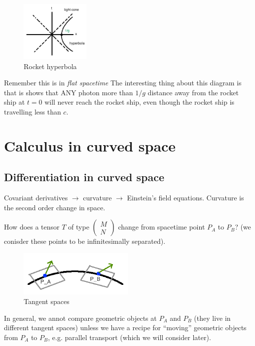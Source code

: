 \documentclass[a4paper]{article} %
\newcommand{\pmx}[1]{
\begin{pmatrix}
#1
\end{pmatrix}
}
\begin{document}
\begin{figure}[h]
\centering
\includegraphics[width=0.3\textwidth]{images/rocket_hyperbola.png}
\caption{Rocket hyperbola}
\end{figure}

Remember this is in \emph{flat spacetime} The interesting thing about this diagram is that is shows that ANY photon more than $1/g$ distance away from the rocket ship at $t=0$ will never reach the rocket ship, even though the rocket ship is travelling less than $c$.


\section{Calculus in curved space}

\subsection{Differentiation in curved space}
Covariant derivatives $\to$ curvature $\to$ Einstein's field equations. Curvature is the second order change in space.

How does a tensor $T$ of type $\pmx{M\\N}$ change from spacetime point $P_A$ to $P_B$? (we conisder these points to be infinitesimally separated).

\begin{figure}[h]
\centering
\includegraphics[width=0.5\textwidth]{images/tangent-spaces.png}
\caption{Tangent spaces}
\end{figure}

In general, we annot compare geometric objects at $P_A$ and $P_B$ (they live in different tangent spaces) unless we have a recipe for ``moving'' geometric objects from $P_A$ to $P_B$, e.g. parallel transport (which we will consider later).
\end{document}
